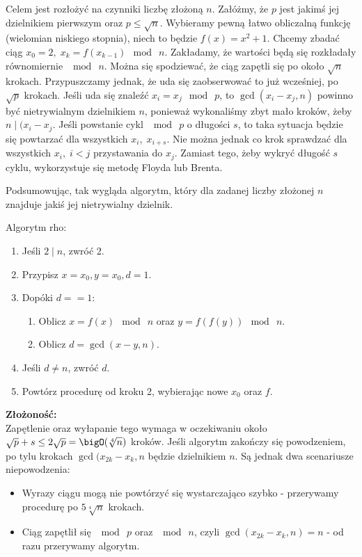 Celem jest rozłożyć na czynniki liczbę złożoną \( n \). Załóżmy, że \( p \) jest jakimś jej dzielnikiem pierwszym oraz \( p \leq \sqrt{n} \). Wybieramy pewną łatwo obliczalną funkcję (wielomian niskiego stopnia), niech to będzie \( f(x) = x^2 + 1 \). Chcemy zbadać ciąg \( x_0 = 2,\; x_k = f(x_{k-1}) \mod \ n \). Zakładamy, że wartości będą się rozkładały równomiernie \( \mod \ n \). Można się spodziewać, że ciąg zapętli się po około \( \sqrt{n} \) krokach. Przypuszczamy jednak, że uda się zaobserwować to już wcześniej, po \( \sqrt{p} \) krokach. Jeśli uda się znaleźć \( x_i = x_j \mod \ p \), to \( \gcd(x_i - x_j, n) \) powinno być nietrywialnym dzielnikiem \( n \), ponieważ wykonaliśmy zbyt mało kroków, żeby \( n \mid (x_i - x_j \). Jeśli powstanie cykl \( \mod \ p \) o długości \( s \), to taka sytuacja będzie się powtarzać dla wszystkich \( x_i,\; x_{i+s} \). Nie można jednak co krok sprawdzać dla wszystkich \( x_i,\; i < j \) przystawania do \( x_j \). Zamiast tego, żeby wykryć długość \( s \) cyklu, wykorzystuje się metodę Floyda lub Brenta.

Podsumowując, tak wygląda algorytm, który dla zadanej liczby złożonej \( n \) znajduje jakiś jej nietrywialny dzielnik.
\begin{greyframe}
    Algorytm rho:
    \begin{enumerate}
        \item Jeśli \( 2 \mid n \), zwróć 2.
        \item Przypisz \( x = x_0, y = x_0, d = 1 \).
        \item Dopóki \( d == 1 \):
        \begin{enumerate}
            \item Oblicz \( x = f(x) \mod \ n \) oraz \( y = f(f(y)) \mod \ n \).
            \item Oblicz \( d = \gcd(x-y, n) \).
        \end{enumerate}
        \item Jeśli \( d \neq n \), zwróć \( d \).
        \item Powtórz procedurę od kroku 2, wybierając nowe \( x_0 \) oraz \( f \).
    \end{enumerate}
\end{greyframe}

\textbf{Złożoność:} \\
Zapętlenie oraz wyłapanie tego wymaga w oczekiwaniu około \( \sqrt{p} + s \leq 2\sqrt{p} = \bigO(\sqrt[4]{n}) \) kroków. Jeśli algorytm zakończy się powodzeniem, po tylu krokach \( \gcd(x_{2k} - x_k, n \) będzie dzielnikiem \( n \).
Są jednak dwa scenariusze niepowodzenia:
\begin{itemize}
    \item Wyrazy ciągu mogą nie powtórzyć się wystarczająco szybko - przerywamy procedurę po \( 5\sqrt[4]{n} \) krokach.
    \item Ciąg zapętlił się \( \mod \ p \) oraz \( \mod \ n \), czyli \( \gcd(x_{2k} - x_k, n) = n \) - od razu przerywamy algorytm.
\end{itemize}


